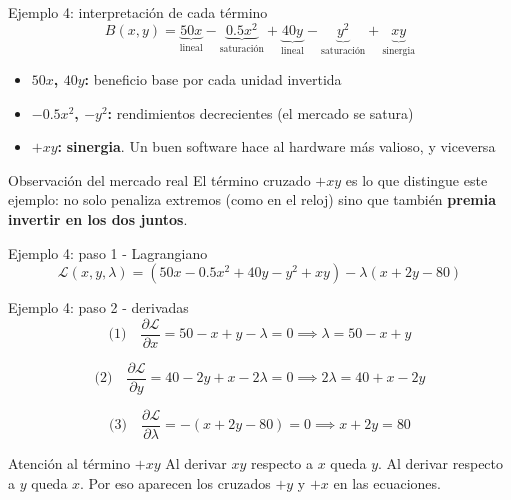 \documentclass{beamer}
\begin{document}
\begin{frame}{Ejemplo 4: interpretación de cada término}
    \small
    \[
    B(x, y) = \underbrace{50x}_{\text{lineal}} - \underbrace{0.5x^2}_{\text{saturación}} + \underbrace{40y}_{\text{lineal}} - \underbrace{y^2}_{\text{saturación}} + \underbrace{xy}_{\text{sinergia}}
    \]

    \vspace{0.8em}

    \begin{itemize}
        \item \textbf{$50x$, $40y$:} beneficio base por cada unidad invertida
        \item \textbf{$-0.5x^2$, $-y^2$:} rendimientos decrecientes (el mercado se satura)
        \item \textbf{$+xy$:} \textbf{sinergia}. Un buen software hace al hardware más valioso, y viceversa
    \end{itemize}

    \vspace{0.5em}

    \begin{alertblock}{Observación del mercado real}
        El término cruzado $+xy$ es lo que distingue este ejemplo: no solo penaliza extremos (como en el reloj) sino que también \textbf{premia invertir en los dos juntos}.
    \end{alertblock}
\end{frame}

\begin{frame}{Ejemplo 4: paso 1 - Lagrangiano}
    \small
    \[
    \mathcal{L}(x, y, \lambda) = (50x - 0.5x^2 + 40y - y^2 + xy) - \lambda(x + 2y - 80)
    \]
\end{frame}

\begin{frame}{Ejemplo 4: paso 2 - derivadas}
    \small
    \[
    \text{(1)} \quad \frac{\partial \mathcal{L}}{\partial x} = 50 - x + y - \lambda = 0 \implies \lambda = 50 - x + y
    \]

    \vspace{0.3em}

    \[
    \text{(2)} \quad \frac{\partial \mathcal{L}}{\partial y} = 40 - 2y + x - 2\lambda = 0 \implies 2\lambda = 40 + x - 2y
    \]

    \vspace{0.3em}

    \[
    \text{(3)} \quad \frac{\partial \mathcal{L}}{\partial \lambda} = -(x + 2y - 80) = 0 \implies x + 2y = 80
    \]

    \vspace{0.5em}

    \begin{alertblock}{Atención al término $+xy$}
        Al derivar $xy$ respecto a $x$ queda $y$. Al derivar respecto a $y$ queda $x$. Por eso aparecen los cruzados $+y$ y $+x$ en las ecuaciones.
    \end{alertblock}
\end{frame}
\end{document}
